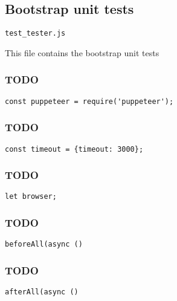 \documentclass[a4paper]{article}
\begin{document}
\hypertarget{toc700}{}
\subsection{Bootstrap unit tests}

\begin{lstlisting}
test_tester.js
\end{lstlisting}

This file contains the bootstrap unit tests

\hypertarget{toc701}{}
\subsubsection{TODO}

\begin{lstlisting}
const puppeteer = require('puppeteer');
\end{lstlisting}

\hypertarget{toc702}{}
\subsubsection{TODO}

\begin{lstlisting}
const timeout = {timeout: 3000};
\end{lstlisting}

\hypertarget{toc703}{}
\subsubsection{TODO}

\begin{lstlisting}
let browser;
\end{lstlisting}

\hypertarget{toc704}{}
\subsubsection{TODO}

\begin{lstlisting}
beforeAll(async ()
\end{lstlisting}

\hypertarget{toc705}{}
\subsubsection{TODO}

\begin{lstlisting}
afterAll(async ()
\end{lstlisting}
\end{document}
